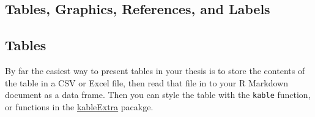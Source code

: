 \documentclass[twoside,12pt,final]{ucthesis-CA2012}
\begin{document}
\begin{ucmainmatter}
{\chapter{Tables, Graphics, References, and Labels}\label{ref-labels}}

\hypertarget{tables}{%
\section{Tables}\label{tables}}

By far the easiest way to present tables in your thesis is to store the
contents of the table in a CSV or Excel file, then read that file in to
your R Markdown document as a data frame. Then you can style the table
with the \texttt{kable} function, or functions in the
\href{https://cran.r-project.org/web/packages/kableExtra/index.html}{kableExtra}
pacakge.


\end{ucmainmatter}
\end{document}
